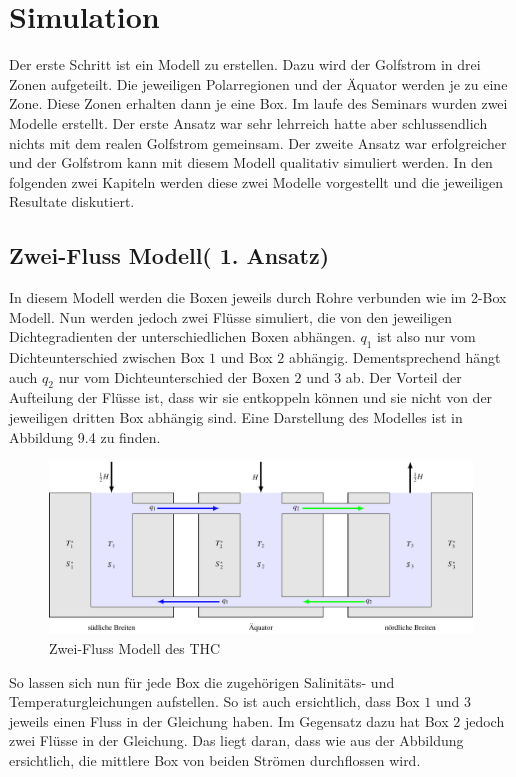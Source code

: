 \section{Simulation}

Der erste Schritt ist ein Modell zu erstellen.
Dazu wird der Golfstrom in drei Zonen aufgeteilt. Die jeweiligen Polarregionen und der Äquator werden je zu eine Zone. Diese Zonen erhalten dann je eine Box.
Im laufe des Seminars wurden zwei Modelle erstellt. Der erste Ansatz war sehr lehrreich hatte aber  schlussendlich nichts mit dem realen Golfstrom gemeinsam. Der zweite Ansatz war erfolgreicher und der Golfstrom kann mit diesem Modell qualitativ simuliert werden.
In den folgenden zwei Kapiteln werden diese zwei Modelle vorgestellt und die jeweiligen Resultate diskutiert.

\subsection{Zwei-Fluss Modell( 1. Ansatz)}

In diesem Modell werden die Boxen jeweils durch Rohre verbunden wie im 2-Box Modell. Nun werden jedoch zwei Flüsse simuliert, die von den jeweiligen Dichtegradienten der unterschiedlichen Boxen abhängen. $q_1$ ist also nur vom Dichteunterschied zwischen Box $1$ und Box $2$ abhängig. Dementsprechend hängt auch $q_2$ nur vom Dichteunterschied der Boxen $2$ und $3$ ab.
Der Vorteil der Aufteilung der Flüsse ist, dass wir sie entkoppeln können und sie nicht von der jeweiligen dritten Box abhängig sind.
Eine Darstellung des Modelles ist in Abbildung 9.4 zu finden.

\begin{figure}
	\centering
	\includegraphics[width=14cm]{thermohalin/tikz/3b2f.pdf}
	\caption{Zwei-Fluss Modell des THC}
		\label{thermohalin:3b2f}
\end{figure}

So lassen sich nun für jede Box die zugehörigen Salinitäts- und Temperaturgleichungen aufstellen. So ist auch ersichtlich, dass Box $1$ und $3$ jeweils einen Fluss in der Gleichung haben. Im Gegensatz dazu hat Box $2$ jedoch zwei Flüsse in der Gleichung. Das liegt daran, dass wie aus der Abbildung ersichtlich, die mittlere Box von beiden Strömen durchflossen wird.


